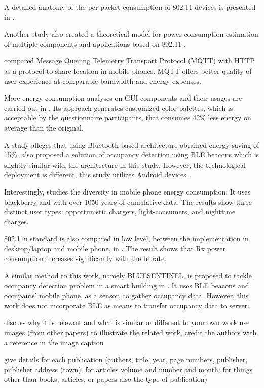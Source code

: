 \documentclass[journal]{vgtc}                %
\begin{document}
A detailed anatomy of the per-packet consumption of 802.11 devices is presented in \cite{Garcia-Saavedra2012}.

Another study also created a theoretical model for power consumption estimation of multiple components and applications based on 802.11 \cite{Marcu2011}.

\cite{Vergara2013} compared Message Queuing Telemetry Transport Protocol (MQTT) with HTTP as a protocol to share location in mobile phones. MQTT offers better quality of user experience at comparable bandwidth and energy expenses.

More energy consumption analyses on GUI components and their usages are carried out in \cite{Bernal-cardenas2015}. Its approach generates customized color palettes, which is acceptable by the questionnaire participants, that consumes 42\% less energy on average than the original.

A study \cite{Corna2015} alleges that using Bluetooth based architecture obtained energy saving of 15\%. \cite{Corna2015} also proposed a solution of occupancy detection using BLE beacons which is slightly similar with the architecture in this study. However, the technological deployment is different, this study utilizes Android devices.

Interestingly, \cite{Oliver2010} studies the diversity in mobile phone energy consumption. It uses blackberry and with over 1050 years of cumulative data. The results show three distinct user types: opportunistic chargers, light-consumers, and nighttime charges.

802.11n standard is also compared in low level, between the implementation in desktop/laptop and mobile phone, in \cite{Warty2012}. The result shows that Rx power consumption increases significantly with the bitrate.

A similar method to this work, namely BLUESENTINEL, is proposed to tackle occupancy detection problem in a smart building in \cite{Conte2014}. It uses BLE beacons and occupants' mobile phone, as a sensor, to gather occupancy data. However, this work does not incorporate BLE as means to transfer occupancy data to server.


discuss why it is relevant and what is similar or different to your own work
use images (from other papers) to illustrate the related work, credit the authors with a reference in the image caption

give details for each publication (authors, title, year, page numbers, publisher, publisher address (town); for articles volume and number and month; for things other than books, articles, or papers also the type of publication)
\end{document}
